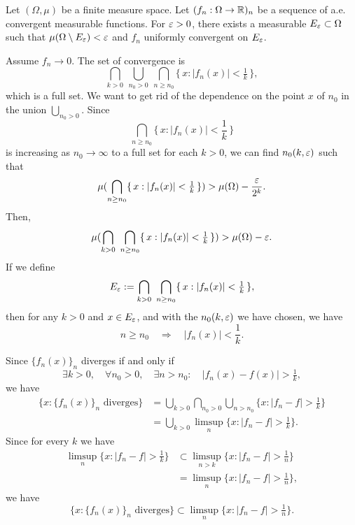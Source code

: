 \documentclass{../note}
\begin{document}
\begin{prb}
Let $(\Omega,\mu)$ be a finite measure space.
Let $(f_n:\Omega\to\mathbb{R})_n$ be a sequence of a.e. convergent measurable functions.
For $\varepsilon>0$, there exists a measurable $E_\varepsilon\subset\Omega$ such that $\mu(\Omega\setminus E_\varepsilon)<\varepsilon$ and $f_n$ uniformly convergent on $E_\varepsilon$.
\end{prb}
\begin{pf}
Assume $f_n\to0$.
The set of convergence is
\[\bigcap_{k>0}\ \bigcup_{n_0>0}\ \bigcap_{n\ge n_0}\{\,x:|f_n(x)|<\tfrac1k\,\},\]
which is a full set.
We want to get rid of the dependence on the point $x$ of $n_0$ in the union $\bigcup_{n_0>0}$.
Since
\[\bigcap_{n\ge n_0}\{\,x:|f_n(x)|<\frac1k\,\}\]
is increasing as $n_0\to\infty$ to a full set for each $k>0$, we can find $n_0(k,\varepsilon)$ such that
\[\mu(\bigcap_{n\ge n_0}\{\,x:|f_n(x)|<\tfrac1k\,\})>\mu(\Omega)-\frac{\varepsilon}{2^k}.\]
Then,
\[\mu(\bigcap_{k>0}\ \bigcap_{n\ge n_0}\{\,x:|f_n(x)|<\tfrac1k\,\})>\mu(\Omega)-\varepsilon.\]
If we define
\[E_\e:=\bigcap_{k>0}\ \bigcap_{n\ge n_0}\{\,x:|f_n(x)|<\tfrac1k\,\},\]
then for any $k>0$ and $x\in E_\varepsilon$, and with the $n_0(k,\varepsilon)$ we have chosen,
we have
\[n\ge n_0\quad\Rightarrow\quad |f_n(x)|<\frac1k.\]
\end{pf}



Since $\{f_n(x)\}_n$ diverges if and only if
\[\exists k>0,\quad\forall n_0>0,\quad\exists n>n_0:\quad|f_n(x)-f(x)|>\tfrac1k,\]
we have
\begin{align*}
\{x:\{f_n(x)\}_n\text{ diverges}\}
&=\bigcup_{k>0}\bigcap_{n_0>0}\bigcup_{n>n_0}\{x:|f_n-f|>\tfrac1k\}\\
&=\bigcup_{k>0}\limsup_n\{x:|f_n-f|>\tfrac1k\}.
\end{align*}
Since for every $k$ we have
\begin{align*}
\limsup_n\{x:|f_n-f|>\tfrac1k\}
&\subset\limsup_{n>k}\{x:|f_n-f|>\tfrac1n\}\\
&=\limsup_n\{x:|f_n-f|>\tfrac1n\},
\end{align*}
we have
\[\{x:\{f_n(x)\}_n\text{ diverges}\}\subset\limsup_n\{x:|f_n-f|>\tfrac1n\}.\]
\end{document}
